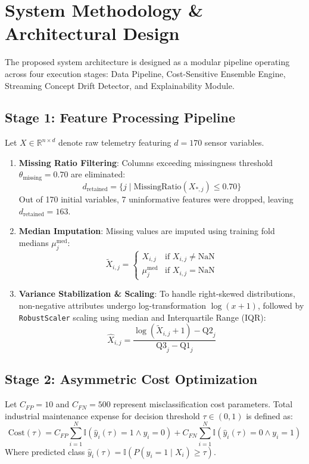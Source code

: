 \documentclass[conference]{IEEEtran}
\begin{document}
\section{System Methodology \& Architectural Design}
The proposed system architecture is designed as a modular pipeline operating across four execution stages: Data Pipeline, Cost-Sensitive Ensemble Engine, Streaming Concept Drift Detector, and Explainability Module.

\subsection{Stage 1: Feature Processing Pipeline}
Let $X \in \mathbb{R}^{n \times d}$ denote raw telemetry featuring $d = 170$ sensor variables.
\begin{enumerate}
    \item \textbf{Missing Ratio Filtering}: Columns exceeding missingness threshold $\theta_{\text{missing}} = 0.70$ are eliminated:
    \begin{equation}
    d_{\text{retained}} = \{ j \mid \text{MissingRatio}(X_{*,j}) \le 0.70 \}
    \end{equation}
    Out of 170 initial variables, 7 uninformative features were dropped, leaving $d_{\text{retained}} = 163$.
    \item \textbf{Median Imputation}: Missing values are imputed using training fold medians $\mu_{j}^{\text{med}}$:
    \begin{equation}
    \tilde{X}_{i,j} = \begin{cases} X_{i,j} & \text{if } X_{i,j} \ne \text{NaN} \\ \mu_{j}^{\text{med}} & \text{if } X_{i,j} = \text{NaN} \end{cases}
    \end{equation}
    \item \textbf{Variance Stabilization \& Scaling}: To handle right-skewed distributions, non-negative attributes undergo log-transformation $\log(x + 1)$, followed by \texttt{RobustScaler} scaling using median and Interquartile Range (IQR):
    \begin{equation}
    \hat{X}_{i,j} = \frac{\log(\tilde{X}_{i,j} + 1) - \text{Q2}_j}{\text{Q3}_j - \text{Q1}_j}
    \end{equation}
\end{enumerate}

\subsection{Stage 2: Asymmetric Cost Optimization}
Let $C_{FP} = 10$ and $C_{FN} = 500$ represent misclassification cost parameters. Total industrial maintenance expense for decision threshold $\tau \in (0, 1)$ is defined as:
\begin{equation}
\text{Cost}(\tau) = C_{FP} \sum_{i=1}^{N} \mathbb{I}(\hat{y}_i(\tau) = 1 \land y_i = 0) + C_{FN} \sum_{i=1}^{N} \mathbb{I}(\hat{y}_i(\tau) = 0 \land y_i = 1)
\end{equation}
Where predicted class $\hat{y}_i(\tau) = \mathbb{I}(P(y_i=1 \mid X_i) \ge \tau)$.
\end{document}
